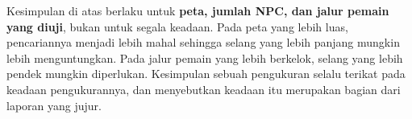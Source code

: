 \begin{peringatanbox}
Kesimpulan di atas berlaku untuk \textbf{peta, jumlah NPC, dan
jalur pemain yang diuji}, bukan untuk segala keadaan. Pada peta yang lebih
luas, pencariannya menjadi lebih mahal sehingga selang yang lebih panjang
mungkin lebih menguntungkan. Pada jalur pemain yang lebih berkelok, selang yang
lebih pendek mungkin diperlukan. Kesimpulan sebuah pengukuran selalu terikat
pada keadaan pengukurannya, dan menyebutkan keadaan itu merupakan bagian dari
laporan yang jujur.
\end{peringatanbox}
